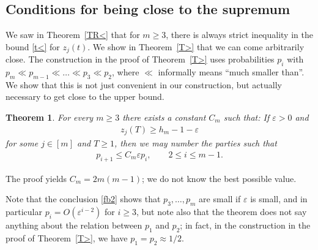 \documentclass[11pt,reqno,tbtags,a4paper]{amsart}
\numberwithin{equation}{section}
\renewcommand\le{\leq}
\renewcommand\ge{\geq}
\renewcommand\leq{\leqslant}
\renewcommand\geq{\geqslant}
\theoremstyle{plain}%
\newtheorem{theorem}{Theorem}[section]
\theoremstyle{definition}
\theoremstyle{remark}
\newcommand{\refT}[1]{Theorem~\ref{#1}}
\newcommand\eps{\varepsilon}
\newcommand\0{{\boldsymbol 0}}
\newcommand\1{{\boldsymbol 1}}
\begin{document}
\subsection{Conditions for being close to the supremum}\label{Sclose}
We saw in \refT{TR<} that for $m\ge3$, there is always strict inequality
in the bound \eqref{t<} for $z_j(t)$. 
We show in \refT{T>} that we can come arbitrarily
close. The construction in the proof of \refT{T>} uses probabilities $p_i$
with
$p_m \ll p_{m-1} \ll\dots\ll p_3 \ll p_2$, 
where $\ll$ informally means ``much smaller than''.
We show that this is not just convenient in our construction, but actually
necessary to get close to the upper bound.
\begin{theorem}\label{Tchar}
  For every $m\ge3$ there exists a constant $C_m$ such that:
If $\eps>0$ and 
\begin{align}\label{fb1}
  z_j(T) \ge h_m-1-\eps
\end{align}
for some $j\in[m]$ and $T\ge1$, 
then we may number the parties such that
\begin{align}\label{fb2}
  p_{i+1} \le C_m \eps p_i, 
\qquad 2\le i\le m-1.
\end{align}
\end{theorem}
The proof yields $C_m=2m(m-1)$; we do not know the best possible value.

Note that the conclusion \eqref{fb2} shows that $p_3,\dots,p_m$ are small
if $\eps$ is small, and in particular 
$p_i=O(\eps^{i-2})$ for $i\ge3$, but note also that
the theorem does not say anything about the relation between $p_1$ and $p_2$; in
fact, in the construction in the proof of \refT{T>}, we have
$p_1=p_2\approx 1/2$.  
\end{document}
